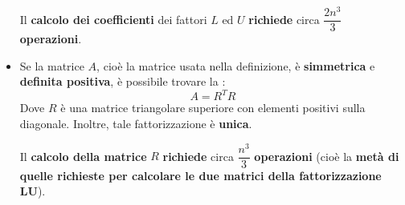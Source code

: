 \begin{itemize}
    Il \textbf{calcolo dei coefficienti} dei fattori $L$ ed $U$ \textbf{richiede} circa $\dfrac{2n^{3}}{3}$ \textbf{operazioni}.
    

    \item Se la matrice $A$, cioè la matrice usata nella definizione, è \textbf{simmetrica} e \textbf{definita positiva}, è possibile trovare la :
    \begin{equation}\label{eq: fattorizzazione di Cholesky}
        A = R^{T}R
    \end{equation}
    Dove $R$ è una matrice triangolare superiore con elementi positivi sulla diagonale. Inoltre, tale fattorizzazione è \textbf{unica}.

    Il \textbf{calcolo della matrice} $R$ \textbf{richiede} circa $\dfrac{n^{3}}{3}$ \textbf{operazioni} (cioè la \textbf{metà di quelle richieste per calcolare le due matrici della fattorizzazione LU}).
\end{itemize}